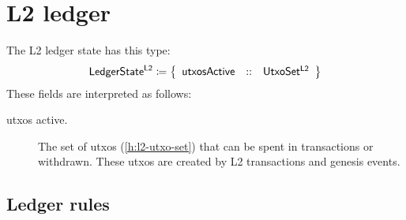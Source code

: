 \documentclass[../hydrozoa.tex]{subfiles}
\begin{document}
\chapter{L2 ledger}%
\label{h:l2-ledger}%

The L2 ledger state has this type:
\begin{equation*}
  \mathsf{LedgerState^{L2}} \coloneq \left\{
  \begin{array}{lll}
    \mathsf{utxosActive} &::& \mathsf{UtxoSet^{L2}}
  \end{array}\right\}
\end{equation*}
These fields are interpreted as follows:
\begin{description}
  \item[utxos active.] The set of utxos (\cref{h:l2-utxo-set}) that can be spent in transactions or withdrawn.
    These utxos are created by L2 transactions and genesis events.
\end{description}

\section{Ledger rules}%
\label{h:l2-ledger-rules}%
\end{document}
